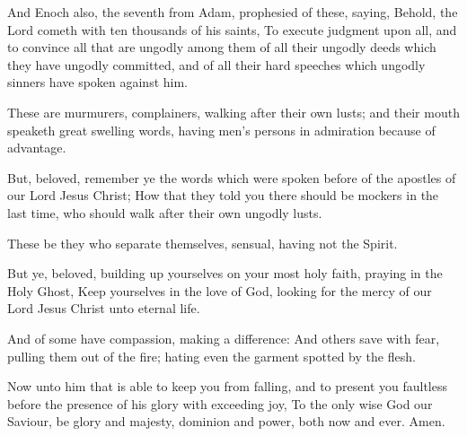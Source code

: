 \verse And Enoch also, the seventh from Adam, prophesied of these, saying, Behold, the Lord cometh with ten thousands of his saints, \verse To execute judgment upon all, and to convince all that are ungodly among them of all their ungodly deeds which they have ungodly committed, and of all their hard speeches which ungodly sinners have spoken against him.

\verse These are murmurers, complainers, walking after their own lusts; and their mouth speaketh great swelling words, having men's persons in admiration because of advantage.

\verse But, beloved, remember ye the words which were spoken before of the apostles of our Lord Jesus Christ; \verse How that they told you there should be mockers in the last time, who should walk after their own ungodly lusts.

\verse These be they who separate themselves, sensual, having not the Spirit.

\verse But ye, beloved, building up yourselves on your most holy faith, praying in the Holy Ghost, \verse Keep yourselves in the love of God, looking for the mercy of our Lord Jesus Christ unto eternal life.

\verse And of some have compassion, making a difference: \verse And others save with fear, pulling them out of the fire; hating even the garment spotted by the flesh.

\verse Now unto him that is able to keep you from falling, and to present you faultless before the presence of his glory with exceeding joy, \verse To the only wise God our Saviour, be glory and majesty, dominion and power, both now and ever. Amen.

